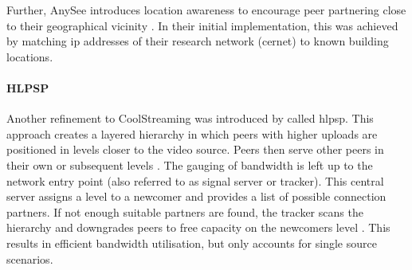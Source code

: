 Further, AnySee introduces location awareness to encourage peer partnering close to their geographical vicinity \citep[\S{V.B.1}]{anysee}. In their initial implementation, this was achieved by matching \gls{ip} addresses of their research network (\gls{cernet}) to known building locations.

\paragraph{HLPSP}
Another refinement to CoolStreaming was introduced by \citet*{hlpsp} called \gls{hlpsp}. This approach creates a layered hierarchy in which peers with higher uploads are positioned in levels closer to the video source. Peers then serve other peers in their own or subsequent levels \cite[\S3]{hlpsp}. The gauging of bandwidth is left up to the network entry point (also referred to as signal server or tracker). This central server assigns a level to a newcomer and provides a list of possible connection partners. If not enough suitable partners are found, the tracker scans the hierarchy and downgrades peers to free capacity on the newcomers level \cite[\S3.3.2]{hlpsp}. This results in efficient bandwidth utilisation, but only accounts for single source scenarios.
